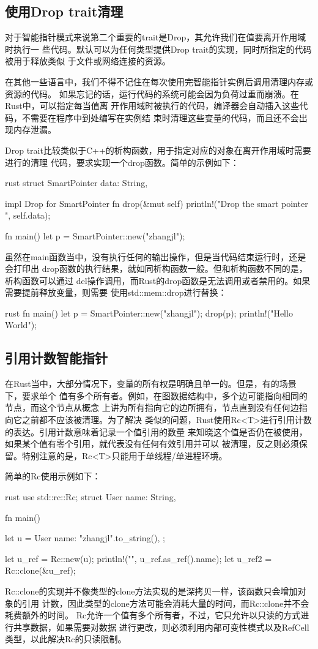 \subsection{使用Drop trait清理}
对于智能指针模式来说第二个重要的trait是Drop，其允许我们在值要离开作用域时执行一
些代码。默认可以为任何类型提供Drop trait的实现，同时所指定的代码被用于释放类似
于文件或网络连接的资源。

在其他一些语言中，我们不得不记住在每次使用完智能指针实例后调用清理内存或资源的代码。
如果忘记的话，运行代码的系统可能会因为负荷过重而崩溃。在Rust中，可以指定每当值离
开作用域时被执行的代码，编译器会自动插入这些代码，不需要在程序中到处编写在实例结
束时清理这些变量的代码，而且还不会出现内存泄漏。

Drop trait比较类似于C++的析构函数，用于指定对应的对象在离开作用域时需要进行的清理
代码，要求实现一个drop函数。简单的示例如下：
\begin{code-block}{rust}
struct SmartPointer {
    data: String,
}

impl Drop for SmartPointer {
    fn drop(&mut self) {
        println!("Drop the smart pointer {}", self.data);
    }
}

fn main() {
    let p = SmartPointer::new("zhangjl");
}
\end{code-block}
虽然在main函数当中，没有执行任何的输出操作，但是当代码结束运行时，还是会打印出
drop函数的执行结果，就如同析构函数一般。但和析构函数不同的是，析构函数可以通过
del操作调用，而Rust的drop函数是无法调用或者禁用的。如果需要提前释放变量，则需要
使用std::mem::drop进行替换：
\begin{code-block}{rust}
fn main() {
    let p = SmartPointer::new("zhangjl");
    drop(p);
    println!("Hello World");
}
\end{code-block}

\subsection{引用计数智能指针}
在Rust当中，大部分情况下，变量的所有权是明确且单一的。但是，有的场景下，要求单个
值有多个所有者。例如，在图数据结构中，多个边可能指向相同的节点，而这个节点从概念
上讲为所有指向它的边所拥有，节点直到没有任何边指向它之前都不应该被清理。为了解决
类似的问题，Rust使用Rc<T>进行引用计数的表达。引用计数意味着记录一个值引用的数量
来知晓这个值是否仍在被使用，如果某个值有零个引用，就代表没有任何有效引用并可以
被清理，反之则必须保留。特别注意的是，Rc<T>只能用于单线程/单进程环境。

简单的Rc使用示例如下：
\begin{code-block}{rust}
use std::rc::Rc;
struct User {
    name: String,
}

fn main() {
    let u = User {
        name: "zhangjl".to_string(),
    };

    let u_ref = Rc::new(u);
    println!("{}", u_ref.as_ref().name);
    let u_ref2 = Rc::clone(&u_ref);
}
\end{code-block}
Rc::clone的实现并不像类型的clone方法实现的是深拷贝一样，该函数只会增加对象的引用
计数，因此类型的clone方法可能会消耗大量的时间，而Rc::clone并不会耗费额外的时间。
Rc允许一个值有多个所有者，不过，它只允许以只读的方式进行共享数据，如果需要对数据
进行更改，则必须利用内部可变性模式以及RefCell类型，以此解决Rc的只读限制。


